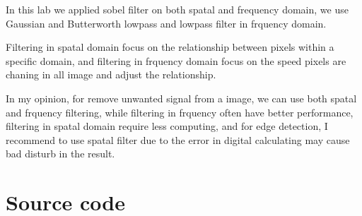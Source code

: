 \documentclass[
	12pt, %
]{style/fphw}
\begin{document}
In this lab we applied sobel filter on both spatal and frequency domain, we use Gaussian and Butterworth lowpass and lowpass filter in frquency domain. 

Filtering in spatal domain focus on the relationship between pixels within a specific domain, and filtering in frquency domain focus on the speed pixels are chaning in all image and adjust the relationship. 

In my opinion, for remove unwanted signal from a image, we can use both spatal and frquency filtering, while filtering in frquency often have better performance, filtering in spatal domain require less computing, and for edge detection, I recommend to use spatal filter due to the error in digital calculating may cause bad disturb in the result.

\newpage
\section*{Source code}

\inputminted[linenos,breaklines, breakafter=d, bgcolor=bg]{python}{code/EE326_SUSTech.py}

\inputminted[linenos,breaklines, breakafter=d, bgcolor=bg]{python}{code/sobel_filter_11810818.py}

\inputminted[linenos,breaklines, breakafter=d, bgcolor=bg]{python}{code/gaussian_pass_11810818.py}

\inputminted[linenos,breaklines, breakafter=d, bgcolor=bg]{python}{code/butterworth_notch_filters_11810818.py}
\end{document}
